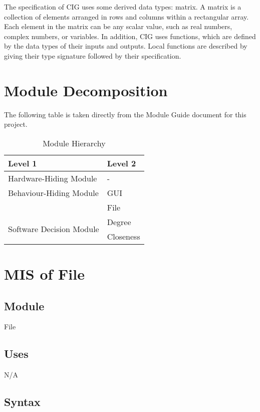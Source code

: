\documentclass[12pt, titlepage]{article}
\begin{document}
\noindent
The specification of CIG uses some derived data types: matrix. A matrix is a collection of elements arranged in rows and columns within a rectangular array. Each element in the matrix can be any scalar value, such as real numbers, complex numbers, or variables. In addition, CIG uses functions, which
are defined by the data types of their inputs and outputs. Local functions are
described by giving their type signature followed by their specification.

\section{Module Decomposition}

The following table is taken directly from the Module Guide document for this project.

\begin{table}[h!]
\centering
\begin{tabular}{p{} p{}}
\toprule
\textbf{Level 1} & \textbf{Level 2}\\
\midrule

{Hardware-Hiding Module} & - \\
\midrule

{Behaviour-Hiding Module} & GUI \\ & File\\
\midrule

\multirow{3}{0.3\textwidth}{Software Decision Module} & Degree\\ & Closeness\\
\bottomrule

\end{tabular}
\caption{Module Hierarchy}
\label{TblMH}
\end{table}

\newpage

\section{MIS of File } \label{Module} 


\subsection{Module}
File 

\subsection{Uses}
N/A
\subsection{Syntax}
\end{document}
